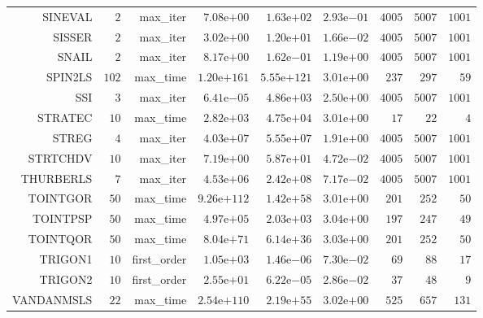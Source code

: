 \begin{longtable}{rrrrrrrrr}
SINEVAL & \(     2\) & max\_iter & \( 7.08\)e\(+00\) & \( 1.63\)e\(+02\) & \( 2.93\)e\(-01\) & \(  4005\) & \(  5007\) & \(  1001\) \\
SISSER & \(     2\) & max\_iter & \( 3.02\)e\(+00\) & \( 1.20\)e\(+01\) & \( 1.66\)e\(-02\) & \(  4005\) & \(  5007\) & \(  1001\) \\
SNAIL & \(     2\) & max\_iter & \( 8.17\)e\(+00\) & \( 1.62\)e\(-01\) & \( 1.19\)e\(+00\) & \(  4005\) & \(  5007\) & \(  1001\) \\
SPIN2LS & \(   102\) & max\_time & \(1.20\)e\(+161\) & \(5.55\)e\(+121\) & \( 3.01\)e\(+00\) & \(   237\) & \(   297\) & \(    59\) \\
SSI & \(     3\) & max\_iter & \( 6.41\)e\(-05\) & \( 4.86\)e\(+03\) & \( 2.50\)e\(+00\) & \(  4005\) & \(  5007\) & \(  1001\) \\
STRATEC & \(    10\) & max\_time & \( 2.82\)e\(+03\) & \( 4.75\)e\(+04\) & \( 3.01\)e\(+00\) & \(    17\) & \(    22\) & \(     4\) \\
STREG & \(     4\) & max\_iter & \( 4.03\)e\(+07\) & \( 5.55\)e\(+07\) & \( 1.91\)e\(+00\) & \(  4005\) & \(  5007\) & \(  1001\) \\
STRTCHDV & \(    10\) & max\_iter & \( 7.19\)e\(+00\) & \( 5.87\)e\(+01\) & \( 4.72\)e\(-02\) & \(  4005\) & \(  5007\) & \(  1001\) \\
THURBERLS & \(     7\) & max\_iter & \( 4.53\)e\(+06\) & \( 2.42\)e\(+08\) & \( 7.17\)e\(-02\) & \(  4005\) & \(  5007\) & \(  1001\) \\
TOINTGOR & \(    50\) & max\_time & \(9.26\)e\(+112\) & \( 1.42\)e\(+58\) & \( 3.01\)e\(+00\) & \(   201\) & \(   252\) & \(    50\) \\
TOINTPSP & \(    50\) & max\_time & \( 4.97\)e\(+05\) & \( 2.03\)e\(+03\) & \( 3.04\)e\(+00\) & \(   197\) & \(   247\) & \(    49\) \\
TOINTQOR & \(    50\) & max\_time & \( 8.04\)e\(+71\) & \( 6.14\)e\(+36\) & \( 3.03\)e\(+00\) & \(   201\) & \(   252\) & \(    50\) \\
TRIGON1 & \(    10\) & first\_order & \( 1.05\)e\(+03\) & \( 1.46\)e\(-06\) & \( 7.30\)e\(-02\) & \(    69\) & \(    88\) & \(    17\) \\
TRIGON2 & \(    10\) & first\_order & \( 2.55\)e\(+01\) & \( 6.22\)e\(-05\) & \( 2.86\)e\(-02\) & \(    37\) & \(    48\) & \(     9\) \\
VANDANMSLS & \(    22\) & max\_time & \(2.54\)e\(+110\) & \( 2.19\)e\(+55\) & \( 3.02\)e\(+00\) & \(   525\) & \(   657\) & \(   131\) \\

\end{longtable}

